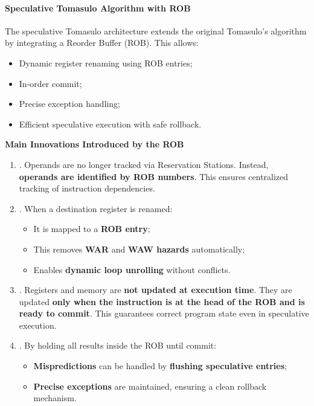 \paragraph{Speculative Tomasulo Algorithm with ROB}

The speculative Tomasulo architecture extends the original Tomasulo's algorithm by integrating a Reorder Buffer (ROB). This allows:
\begin{itemize}[label=\textcolor{Green3}{}]
    \item Dynamic register renaming using ROB entries;
    \item In-order commit;
    \item Precise exception handling;
    \item Efficient speculative execution with safe rollback.
\end{itemize}

\highspace
\begin{flushleft}
    \textcolor{Green3}{ \textbf{Main Innovations Introduced by the ROB}}
\end{flushleft}
\begin{enumerate}
    \item {}. Operands are no longer tracked via Reservation Stations. Instead, \textbf{operands are identified by ROB numbers}. This ensures centralized tracking of instruction dependencies.

    \item {}. When a destination register is renamed:
    \begin{itemize}
        \item It is mapped to a \textbf{ROB entry};
        \item This removes \textbf{WAR} and \textbf{WAW hazards} automatically;
        \item Enables \textbf{dynamic loop unrolling} without conflicts.
    \end{itemize}
    
    \item {}. Registers and memory are \textbf{not updated at execution time}. They are updated \textbf{only when the instruction is at the head of the ROB and is ready to commit}. This guarantees correct program state even in speculative execution.

    \item {}. By holding all results inside the ROB until commit:
    \begin{itemize}
        \item \textbf{Mispredictions} can be handled by \textbf{flushing speculative entries};
        \item \textbf{Precise exceptions} are maintained, ensuring a clean rollback mechanism.
    \end{itemize}
\end{enumerate}


